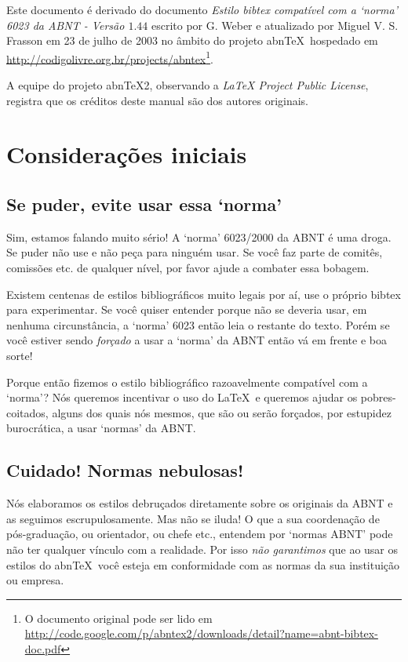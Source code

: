 \documentclass[a4paper]{ltxdoc}
\newcommand{\abnTeX}{abn\TeX}
\begin{document}
Este documento é derivado do documento \emph{Estilo bibtex compatível com a
`norma' 6023 da ABNT - Versão $ 1.44 $} escrito por G. Weber e atualizado por
Miguel V. S. Frasson em 23 de julho de 2003 no âmbito do projeto \abnTeX\
hospedado em \url{http://codigolivre.org.br/projects/abntex}\footnote{O documento original
pode ser lido em
\url{http://code.google.com/p/abntex2/downloads/detail?name=abnt-bibtex-doc.pdf}}.

A equipe do projeto \abnTeX2, observando a \emph{LaTeX Project Public License},
registra que os créditos deste manual são dos autores originais.

\section{Considerações iniciais}

\subsection{Se puder, evite usar essa `norma'}

Sim, estamos falando muito sério! A `norma' 6023/2000\cite{NBR6023:2000} da ABNT
é uma droga. Se puder não use e não peça para ninguém usar. Se você faz parte de
comitês, comissões etc. de qualquer nível, por favor ajude a combater essa
bobagem.

Existem centenas de estilos bibliográficos muito legais por aí, use o próprio
\textsf{bibtex} para experimentar. Se você quiser entender porque não se deveria
usar, em nenhuma circunstância, a `norma' 6023 então leia o restante do texto.
Porém se você estiver sendo \emph{forçado} a usar a `norma' da ABNT então vá em
frente e boa sorte!

Porque então fizemos o estilo bibliográfico razoavelmente compatível
com a `norma'? Nós queremos incentivar o uso do \LaTeX\  e queremos
ajudar os pobres-coitados, alguns dos quais nós mesmos, que são ou
serão forçados, por estupidez burocrática, a usar `normas' da ABNT.

\subsection{Cuidado! Normas nebulosas!}

Nós elaboramos os estilos debruçados diretamente sobre os originais da ABNT
e as seguimos escrupulosamente. Mas não se iluda! O que a sua coordenação
de pós-graduação, ou orientador, ou chefe etc., entendem por `normas ABNT'
pode não ter qualquer vínculo com a realidade. Por isso \emph{não garantimos}
que ao usar os estilos do \abnTeX\ você esteja em conformidade com as normas
da sua instituição ou empresa.
\end{document}
